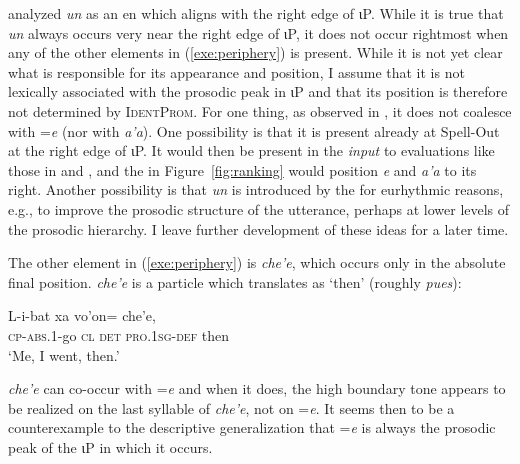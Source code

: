 \documentclass[output=paper,
modfonts
]{LSP/langsci}
\begin{document}
 \citet{aissen1992} analyzed \emph{un} as an en which aligns with the right edge of ιP. 
While it is true that \emph{un} always occurs very near the right edge of ιP,  it does not occur rightmost when any of the other elements in (\ref{exe:periphery}) is present. 
While it is not yet clear what is responsible for its appearance and position, I assume that it is not lexically associated
with the prosodic peak in ιP and that its position is therefore not determined by \textsc{IdentProm}. For one thing, as
observed in \citet{skopeteas2010}, it does not coalesce with =\emph{e} (nor with \emph{a'a}). 
One possibility is that it is present already at Spell-Out at the right edge of ιP. 
It would then be present in the \emph{input} to evaluations like those in  and ,
 and the   in Figure~\ref{fig:ranking} would position \emph{e} and \emph{a'a} to its right.
Another possibility is that \emph{un} is introduced by the  for eurhythmic reasons, e.g., 
to improve the prosodic structure of the utterance, perhaps at lower levels of the prosodic hierarchy. 
I leave further  development of these ideas for a later time.

The other element in (\ref{exe:periphery}) is \emph{che'e}, which occurs only in the absolute final position.  
\emph{che'e} is a  particle which \citet{laughlin1975} translates
as `then' (roughly  \emph{pues}): 
\begin{exe}
\ex\label{exe:che'ee}\bridgeoverex
\gll L-i-bat xa  vo'on= che'e, \\
\textsc{cp-abs.1}-go \textsc{cl}  \textsc{det} \textsc{pro.1sg}-\textsc{def} then \\
\glt `Me, I went, then.'  \citep[131]{laughlin1977}
\end{exe}
\emph{che'e} can co-occur with =\emph{e} and when
it does, the high boundary tone appears to be realized on the last syllable of \emph{che'e}, 
not on =\emph{e}. It seems then to be a counterexample to the descriptive
generalization that =\emph{e} is always the prosodic peak of the ιP in which it occurs.   
\end{document}
